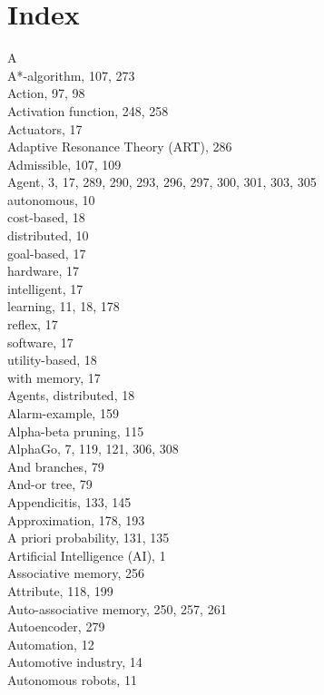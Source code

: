 \documentclass[10pt]{article}
\begin{document}
\section*{Index}
A\\
A*-algorithm, 107, 273\\
Action, 97, 98\\
Activation function, 248, 258\\
Actuators, 17\\
Adaptive Resonance Theory (ART), 286\\
Admissible, 107, 109\\
Agent, 3, 17, 289, 290, 293, 296, 297, 300, 301, 303, 305\\
autonomous, 10\\
cost-based, 18\\
distributed, 10\\
goal-based, 17\\
hardware, 17\\
intelligent, 17\\
learning, 11, 18, 178\\
reflex, 17\\
software, 17\\
utility-based, 18\\
with memory, 17\\
Agents, distributed, 18\\
Alarm-example, 159\\
Alpha-beta pruning, 115\\
AlphaGo, 7, 119, 121, 306, 308\\
And branches, 79\\
And-or tree, 79\\
Appendicitis, 133, 145\\
Approximation, 178, 193\\
A priori probability, 131, 135\\
Artificial Intelligence (AI), 1\\
Associative memory, 256\\
Attribute, 118, 199\\
Auto-associative memory, 250, 257, 261\\
Autoencoder, 279\\
Automation, 12\\
Automotive industry, 14\\
Autonomous robots, 11
\end{document}
